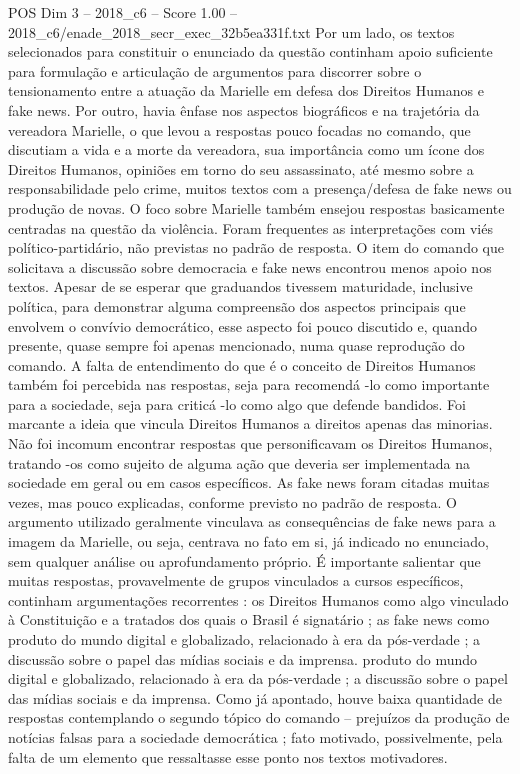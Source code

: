 \begin{textsample}{POS Dim 3 – 2018\_c6 – Score 1.00 – 2018\_c6/enade\_2018\_secr\_exec\_32b5ea331f.txt}
Por um lado, os textos selecionados para constituir o enunciado da questão continham apoio suficiente para formulação e articulação de argumentos para discorrer sobre o tensionamento entre a atuação da Marielle em defesa dos Direitos Humanos e fake news.
Por outro, havia ênfase nos aspectos biográficos e na trajetória da vereadora Marielle, o que levou a respostas pouco focadas no comando, que discutiam a vida e a morte da vereadora, sua importância como um ícone dos Direitos Humanos, opiniões em torno do seu assassinato, até mesmo sobre a responsabilidade pelo crime, muitos textos com a presença/defesa de fake news ou produção de novas.
O foco sobre Marielle também ensejou respostas basicamente centradas na questão da violência.
Foram frequentes as interpretações com viés político-partidário, não previstas no padrão de resposta.
O item do comando que solicitava a discussão sobre democracia e fake news encontrou menos apoio nos textos.
Apesar de se esperar que graduandos tivessem maturidade, inclusive política, para demonstrar alguma compreensão dos aspectos principais que envolvem o convívio democrático, esse aspecto foi pouco discutido e, quando presente, quase sempre foi apenas mencionado, numa quase reprodução do comando.
A falta de entendimento do que é o conceito de Direitos Humanos também foi percebida nas respostas, seja para recomendá -lo como importante para a sociedade, seja para criticá -lo como algo que defende bandidos.
Foi marcante a ideia que vincula Direitos Humanos a direitos apenas das minorias.
Não foi incomum encontrar respostas que personificavam os Direitos Humanos, tratando -os como sujeito de alguma ação que deveria ser implementada na sociedade em geral ou em casos específicos.
As fake news foram citadas muitas vezes, mas pouco explicadas, conforme previsto no padrão de resposta.
O argumento utilizado geralmente vinculava as consequências de fake news para a imagem da Marielle, ou seja, centrava no fato em si, já indicado no enunciado, sem qualquer análise ou aprofundamento próprio.
É importante salientar que muitas respostas, provavelmente de grupos vinculados a cursos específicos, continham argumentações recorrentes : os Direitos Humanos como algo vinculado à Constituição e a tratados dos quais o Brasil é signatário ; as fake news como produto do mundo digital e globalizado, relacionado à era da pós-verdade ; a discussão sobre o papel das mídias sociais e da imprensa. produto do mundo digital e globalizado, relacionado à era da pós-verdade ; a discussão sobre o papel das mídias sociais e da imprensa.
Como já apontado, houve baixa quantidade de respostas contemplando o segundo tópico do comando – prejuízos da produção de notícias falsas para a sociedade democrática ; fato motivado, possivelmente, pela falta de um elemento que ressaltasse esse ponto nos textos motivadores.

\end{textsample}
